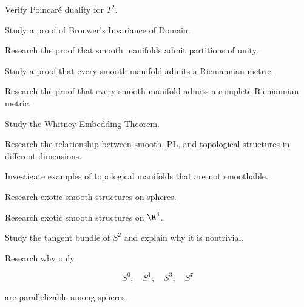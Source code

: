 \begin{exercise}[3]
Verify Poincar\'e duality for \(T^2\).
\end{exercise}

\begin{exercise}[4]
Study a proof of Brouwer's Invariance of Domain.
\end{exercise}

\begin{exercise}[4]
Research the proof that smooth manifolds admit partitions of unity.
\end{exercise}

\begin{exercise}[4]
Study a proof that every smooth manifold admits a Riemannian metric.
\end{exercise}

\begin{exercise}[4]
Research the proof that every smooth manifold admits a complete Riemannian
metric.
\end{exercise}

\begin{exercise}[4]
Study the Whitney Embedding Theorem.
\end{exercise}

\begin{exercise}[4]
Research the relationship between smooth, PL, and topological structures in
different dimensions.
\end{exercise}

\begin{exercise}[4]
Investigate examples of topological manifolds that are not smoothable.
\end{exercise}

\begin{exercise}[4]
Research exotic smooth structures on spheres.
\end{exercise}

\begin{exercise}[4]
Research exotic smooth structures on \(\R^4\).
\end{exercise}

\begin{exercise}[4]
Study the tangent bundle of \(S^2\) and explain why it is nontrivial.
\end{exercise}

\begin{exercise}[4]
Research why only

\[
S^0,\quad S^1,\quad S^3,\quad S^7
\]

are parallelizable among spheres.
\end{exercise}

